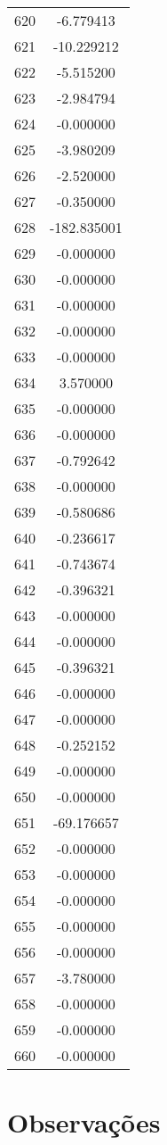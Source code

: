 \documentclass[12pt]{article}
\begin{document}
\begin{longtable}{@{}cc@{}}
620 & -6.779413 \\
621 & -10.229212 \\
622 & -5.515200 \\
623 & -2.984794 \\
624 & -0.000000 \\
625 & -3.980209 \\
626 & -2.520000 \\
627 & -0.350000 \\
628 & -182.835001 \\
629 & -0.000000 \\
630 & -0.000000 \\
631 & -0.000000 \\
632 & -0.000000 \\
633 & -0.000000 \\
634 & 3.570000 \\
635 & -0.000000 \\
636 & -0.000000 \\
637 & -0.792642 \\
638 & -0.000000 \\
639 & -0.580686 \\
640 & -0.236617 \\
641 & -0.743674 \\
642 & -0.396321 \\
643 & -0.000000 \\
644 & -0.000000 \\
645 & -0.396321 \\
646 & -0.000000 \\
647 & -0.000000 \\
648 & -0.252152 \\
649 & -0.000000 \\
650 & -0.000000 \\
651 & -69.176657 \\
652 & -0.000000 \\
653 & -0.000000 \\
654 & -0.000000 \\
655 & -0.000000 \\
656 & -0.000000 \\
657 & -3.780000 \\
658 & -0.000000 \\
659 & -0.000000 \\
660 & -0.000000 \\

\end{longtable}


\section{Observações}
\end{document}
